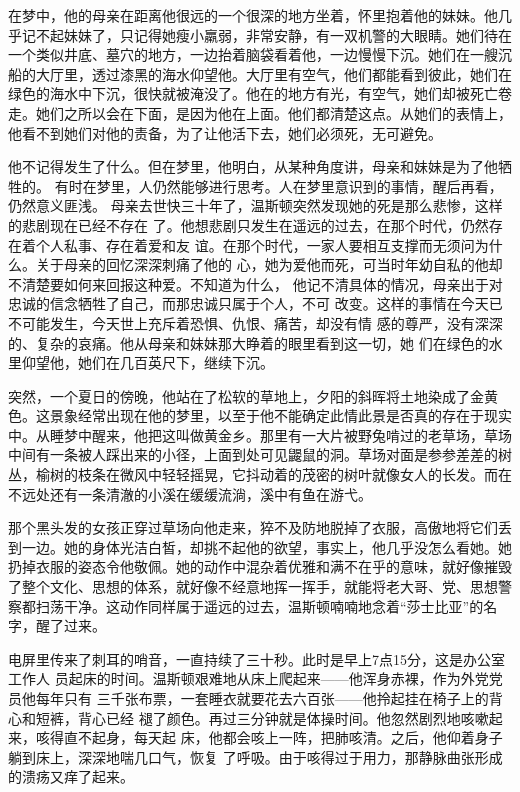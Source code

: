 在梦中，他的母亲在距离他很远的一个很深的地方坐着，怀里抱着他的妹妹。他几乎记不起妹妹了，只记得她瘦小羸弱，非常安静，有一双机警的大眼睛。她们待在一个类似井底、墓穴的地方，一边抬着脑袋看着他，一边慢慢下沉。她们在一艘沉船的大厅里，透过漆黑的海水仰望他。大厅里有空气，他们都能看到彼此，她们在绿色的海水中下沉，很快就被淹没了。他在的地方有光，有空气，她们却被死亡卷走。她们之所以会在下面，是因为他在上面。他们都清楚这点。从她们的表情上，他看不到她们对他的责备，为了让他活下去，她们必须死，无可避免。

他不记得发生了什么。但在梦里，他明白，从某种角度讲，母亲和妹妹是为了他牺牲的。
有时在梦里，人仍然能够进行思考。人在梦里意识到的事情，醒后再看，仍然意义匪浅。
母亲去世快三十年了，温斯顿突然发现她的死是那么悲惨，这样的悲剧现在已经不存在
了。他想悲剧只发生在遥远的过去，在那个时代，仍然存在着个人私事、存在着爱和友
谊。在那个时代，一家人要相互支撑而无须问为什么。关于母亲的回忆深深刺痛了他的
心，她为爱他而死，可当时年幼自私的他却不清楚要如何来回报这种爱。不知道为什么，
他记不清具体的情况，母亲出于对忠诚的信念牺牲了自己，而那忠诚只属于个人，不可
改变。这样的事情在今天已不可能发生，今天世上充斥着恐惧、仇恨、痛苦，却没有情
感的尊严，没有深深的、复杂的哀痛。他从母亲和妹妹那大睁着的眼里看到这一切，她
们在绿色的水里仰望他，她们在几百英尺下，继续下沉。

突然，一个夏日的傍晚，他站在了松软的草地上，夕阳的斜晖将土地染成了金黄色。这景象经常出现在他的梦里，以至于他不能确定此情此景是否真的存在于现实中。从睡梦中醒来，他把这叫做黄金乡。那里有一大片被野兔啃过的老草场，草场中间有一条被人踩出来的小径，上面到处可见鼹鼠的洞。草场对面是参参差差的树丛，榆树的枝条在微风中轻轻摇晃，它抖动着的茂密的树叶就像女人的长发。而在不远处还有一条清澈的小溪在缓缓流淌，溪中有鱼在游弋。

那个黑头发的女孩正穿过草场向他走来，猝不及防地脱掉了衣服，高傲地将它们丢到一边。她的身体光洁白皙，却挑不起他的欲望，事实上，他几乎没怎么看她。她扔掉衣服的姿态令他敬佩。她的动作中混杂着优雅和满不在乎的意味，就好像摧毁了整个文化、思想的体系，就好像不经意地挥一挥手，就能将老大哥、党、思想警察都扫荡干净。这动作同样属于遥远的过去，温斯顿喃喃地念着``莎士比亚''的名字，醒了过来。

电屏里传来了刺耳的哨音，一直持续了三十秒。此时是早上7点15分，这是办公室工作人
员起床的时间。温斯顿艰难地从床上爬起来——他浑身赤裸，作为外党党员他每年只有
三千张布票，一套睡衣就要花去六百张——他拎起挂在椅子上的背心和短裤，背心已经
褪了颜色。再过三分钟就是体操时间。他忽然剧烈地咳嗽起来，咳得直不起身，每天起
床，他都会咳上一阵，把肺咳清。之后，他仰着身子躺到床上，深深地喘几口气，恢复
了呼吸。由于咳得过于用力，那静脉曲张形成的溃疡又痒了起来。

